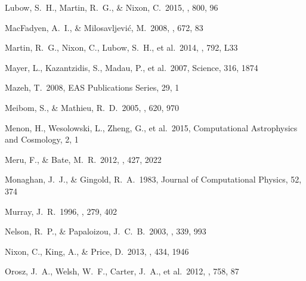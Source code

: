  Lubow, S.~H., Martin, R.~G., \& Nixon, C.\ 2015, \apj, 800, 96


 MacFadyen, A.~I., \& Milosavljevi{\'c}, M.\ 2008, \apj, 672, 83


 Martin, R.~G., Nixon, C., Lubow, S.~H., et al.\ 2014, \apjl, 792, L33


 Mayer, L., Kazantzidis, S., Madau, P., et al.\ 2007, Science, 316, 1874


 Mazeh, T.\ 2008, EAS Publications Series, 29, 1


 Meibom, S., \& Mathieu, R.~D.\ 2005, \apj, 620, 970


 Menon, H., Wesolowski, 
L., Zheng, G., et al.\ 2015, Computational Astrophysics and Cosmology, 2, 1

 Meru, F., \& Bate, M.~R.\ 2012, \mnras, 427, 2022


 Monaghan, J.~J., \& Gingold, R.~A.\ 1983, Journal of Computational Physics, 52, 374

 Murray, J.~R.\ 1996, \mnras, 279, 402


 Nelson, R.~P., \& Papaloizou, J.~C.~B.\ 2003, \mnras, 339, 993

 Nixon, C., King, A., \& Price, D.\ 2013, \mnras, 434, 1946


 Orosz, J.~A., Welsh, 
W.~F., Carter, J.~A., et al.\ 2012, \apj, 758, 87

